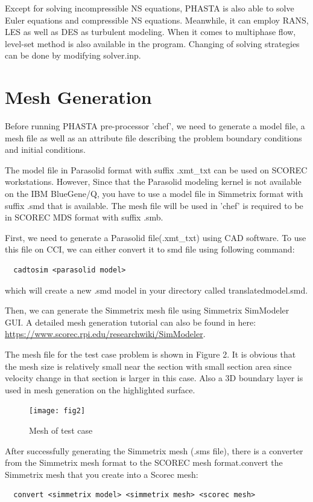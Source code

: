 \documentclass{article}
\begin{document}
Except for solving incompressible NS equations, PHASTA is also able to solve Euler equations and compressible NS equations. Meanwhile, it can employ RANS, LES as well as DES as turbulent modeling. When it comes to multiphase flow, level-set method is also available in the program. Changing of solving strategies can be done by modifying solver.inp.

\section{Mesh Generation}

Before running PHASTA pre-processor 'chef', we need to generate a model file, a mesh file as well as an attribute file describing the problem boundary conditions and initial conditions.

The model file in Parasolid format with suffix .xmt\_txt can be used on SCOREC workstations. However, Since that the Parasolid modeling kernel is not available on the IBM BlueGene/Q, you have to use a model file in Simmetrix format with suffix .smd that is available. The mesh file will be used in 'chef' is required to be in SCOREC MDS format with suffix .smb.

First, we need to generate a Parasolid file(.xmt\_txt) using CAD software. To use this file on CCI, we can either convert it to smd file using following command:
  \begin{lstlisting}
  cadtosim <parasolid model> 
  \end{lstlisting}
which will create a new .smd model in your directory called translatedmodel.smd.

Then, we can generate the Simmetrix mesh file using Simmetrix SimModeler GUI. A detailed mesh generation tutorial can also be found in here:\\
\url{https://www.scorec.rpi.edu/researchwiki/SimModeler}.

The mesh file for the test case problem is shown in Figure 2. It is obvious that the mesh size is relatively small near the section with small section area since velocity change in that section is larger in this case. Also a 3D boundary layer is used in mesh generation on the highlighted surface. 
\begin{figure}[h!]
  \centering
    \texttt{[image: fig2]}
  \caption{Mesh of test case}
\end{figure}

After successfully generating the Simmetrix mesh (.sms file), there is a converter from the Simmetrix mesh format to the SCOREC mesh format.convert the Simmetrix mesh that you create into a Scorec mesh:
  \begin{lstlisting}
  convert <simmetrix model> <simmetrix mesh> <scorec mesh>
  \end{lstlisting}
\end{document}
